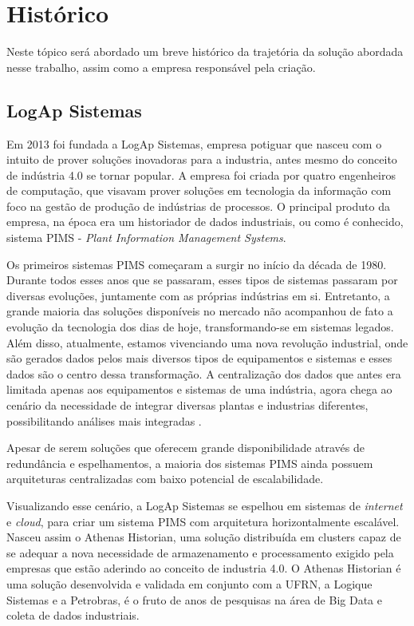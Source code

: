 \section{Histórico}
\label{Sec:historico}

Neste tópico será abordado um breve histórico da trajetória da solução abordada nesse trabalho, assim como a empresa responsável pela criação.


\subsection{LogAp Sistemas}
\label{Sec:logapSistemas}

Em 2013 foi fundada a LogAp Sistemas, empresa potiguar que nasceu com o intuito de prover soluções inovadoras para a industria, antes mesmo do conceito de indústria 4.0 se tornar popular. A empresa foi criada por quatro engenheiros de computação, que visavam prover soluções em tecnologia da informação com foco na gestão de produção de indústrias de processos. O principal produto da empresa, na época era um historiador de dados industriais, ou como é conhecido, sistema PIMS - \textit{Plant Information Management Systems}.

Os primeiros sistemas PIMS começaram a surgir no início da década de 1980. Durante todos esses anos que se passaram, esses tipos de sistemas passaram por diversas evoluções, juntamente com as próprias indústrias em si. Entretanto, a grande maioria das soluções disponíveis no mercado não acompanhou de fato a evolução da tecnologia dos dias de hoje, transformando-se em sistemas legados. Além disso, atualmente, estamos vivenciando uma nova revolução industrial, onde são gerados dados pelos mais diversos tipos de equipamentos e sistemas e esses dados são o centro dessa transformação. A centralização dos dados que antes era limitada apenas aos equipamentos e sistemas de uma indústria, agora chega ao cenário da necessidade de integrar diversas plantas e industrias diferentes, possibilitando análises mais integradas \cite{gerencia-processo-automacao}.

Apesar de serem soluções que oferecem grande disponibilidade através de redundância e espelhamentos, a maioria dos sistemas PIMS ainda possuem arquiteturas centralizadas com baixo potencial de escalabilidade. 

Visualizando esse cenário, a LogAp Sistemas se espelhou em sistemas de \textit{internet} e \textit{cloud}, para criar um sistema PIMS com arquitetura horizontalmente escalável. Nasceu assim o Athenas Historian, uma solução distribuída em clusters capaz de se adequar a nova necessidade de armazenamento e processamento exigido pela empresas que estão aderindo ao conceito de industria 4.0. O Athenas Historian é uma solução desenvolvida e validada em conjunto com a UFRN, a Logique Sistemas e a Petrobras, é o fruto de anos de pesquisas na área de Big Data e coleta de dados industriais.


